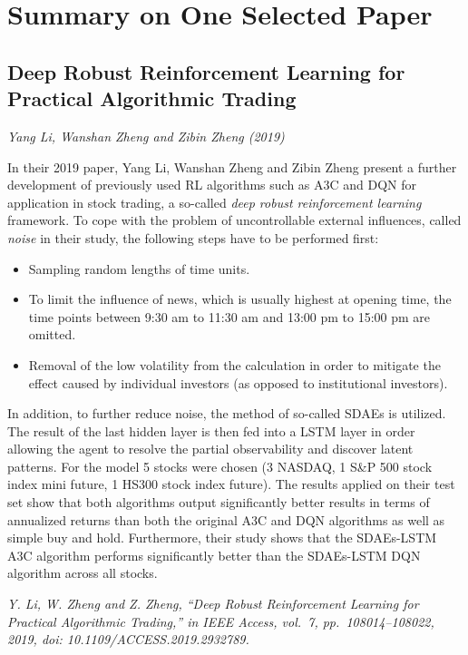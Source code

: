 \section{Summary on One Selected Paper}

\subsection{Deep Robust Reinforcement Learning for Practical Algorithmic Trading}
\textit{Yang Li, Wanshan Zheng and Zibin Zheng (2019)}

In their 2019 paper, Yang Li, Wanshan Zheng and Zibin Zheng present a further development
of previously used RL algorithms such as A3C and DQN for application in stock trading, a
so-called \emph{deep robust reinforcement learning} framework. To cope with the problem of
uncontrollable external influences, called \emph{noise} in their study, the following steps
have to be performed first:
\begin{itemize}
  \item Sampling random lengths of time units.
  \item To limit the influence of news, which is usually highest at opening time, the time
        points between 9:30 am to 11:30 am and 13:00 pm to 15:00 pm are omitted.
  \item Removal of the low volatility from the calculation in order to mitigate the effect
        caused by individual investors (as opposed to institutional investors).
\end{itemize}

In addition, to further reduce noise, the method of so-called SDAEs is utilized. The result
of the last hidden layer is then fed into a LSTM layer in order allowing the agent to
resolve the partial observability and discover latent patterns. For the model 5 stocks were
chosen (3 NASDAQ, 1 S\&P 500 stock index mini future, 1 HS300 stock index future). The
results applied on their test set show that both algorithms output significantly better
results in terms of annualized returns than both the original A3C and DQN algorithms as well
as simple buy and hold. Furthermore, their study shows that the SDAEs-LSTM A3C algorithm
performs significantly better than the SDAEs-LSTM DQN algorithm across all stocks.

\noindent\textit{Y. Li, W. Zheng and Z. Zheng, ``Deep Robust Reinforcement Learning for
Practical Algorithmic Trading,'' in IEEE Access, vol.~7, pp.~108014--108022, 2019,
doi: 10.1109/ACCESS.2019.2932789.}

